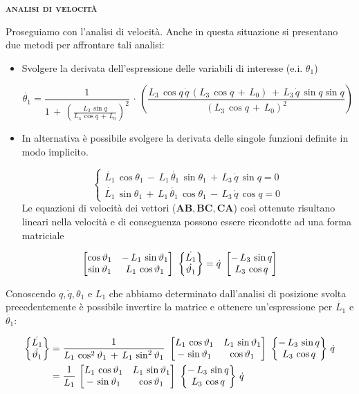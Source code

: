 			\begin{center}
			{\scshape{\bfseries analisi di velocità}}
			\end{center}
			
			Proseguiamo con l'analisi di velocità. Anche in questa situazione si presentano due metodi per affrontare tali analisi:
			
			\begin{itemize}
				\item Svolgere la derivata dell'espressione delle variabili di interesse (e.i. $\theta_1$)
				
				\begin{equation*}
					\dot{\theta_1} = \frac{1}{1\,+\,(\frac{L_3\,\sin{q}}{L_3\,\cos{q}\,+\,L_0})^2} \,\cdot\,(\frac{L_3\,\cos{q}\,\dot{q}\,(L_3\,\cos{q}\,+\,L_0)\,+\,L_3\,\dot{q}\,\sin{q}\sin{q}}{(L_3\,\cos{q}\,+\,L_0)^2})
				\end{equation*}

			
			\item In alternativa è possibile svolgere la derivata delle singole funzioni definite in modo implicito.
			
			\[
			\begin{cases}
				\dot{L_1}\,\cos{\theta_1}\,-\,L_1\,\dot{\theta_1}\,\sin{\theta_1}\,+\,L_3\,\dot{q}\,\sin{q} = 0\\
				\dot{L_1}\,\sin{\theta_1}\,+\,L_1\,\dot{\theta_1}\,\cos{\theta_1}\,-\,L_3\,\dot{q}\,\cos{q} = 0
			\end{cases}
			\]
			Le equazioni di velocità dei vettori ($\mathbf{AB}, \mathbf{BC}, \mathbf{CA}$) così ottenute risultano lineari nella velocità e di conseguenza possono essere ricondotte ad una forma matriciale 
			\end{itemize}
			\begin{equation*}
				\begin{bmatrix}\cos{\vartheta_1}& -\,L_1\,\sin{\vartheta_1}\\ \sin{\vartheta_1} & L_1\,\cos{\vartheta_1}\end{bmatrix}\,\,
				\begin{Bmatrix}\dot{L_1}\\\dot{\vartheta_1}\end{Bmatrix} = \dot{q}\,\,
				\begin{bmatrix}-\,L_3\, \sin{q}\\ L_3\,\cos{q}\end{bmatrix}
			\end{equation*}

		Conoscendo $q, \dot{q}, \theta_1$ e $L_1$ che abbiamo determinato dall'analisi di posizione svolta precedentemente è possibile invertire la matrice e ottenere un'espressione per $\dot{L_1}$ e $\dot{\theta_1}$:
		
		\begin{align*}
			\begin{Bmatrix}\dot{L_1}\\\dot{\vartheta_1}\end{Bmatrix} &= 
			\frac{1}{L_1\,\cos^2{\vartheta_1}\,+\,L_1\,\sin^2{\vartheta_1}}\,\,
			\begin{bmatrix}L_1\,\cos{\vartheta_1}& L_1\,\sin{\vartheta_1}\\-\,\sin{\vartheta_1}&\cos{\vartheta_1}\end{bmatrix}\,\,
			\begin{Bmatrix}-\,L_3\,\sin{q}\\L_3\,\cos{q}\end{Bmatrix}\,\dot{q}\\
			&= \frac{1}{L_1}\,\begin{bmatrix}L_1\,\cos{\vartheta_1}& L_1\,\sin{\vartheta_1}\\-\,\sin{\vartheta_1}&\cos{\vartheta_1}\end{bmatrix}\,\,
			\begin{Bmatrix}-\,L_3\,\sin{q}\\L_3\,\cos{q}\end{Bmatrix}\,\dot{q}
		\end{align*}
		
